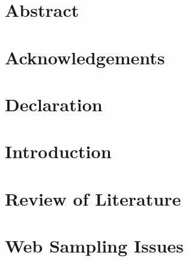 \documentclass[10pt,oneside,a4paper,onecolumn,titlepage,draft]{lancsthesis}
\begin{document}
\frontmatter








\chapter*{Abstract}


\chapter*{Acknowledgements}


\chapter*{Declaration}


\tableofcontents
\listoffigures
\clearpage



\mainmatter


\chapter{Introduction}




\chapter{Review of Literature}



\chapter{Web Sampling Issues}

\end{document}
